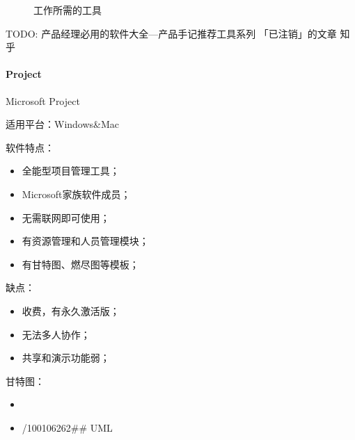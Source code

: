 \documentclass[letterpaper,10pt,english]{sphinxmanual}
\begin{document}

\begin{figure}[H]
\centering
\capstart

\noindent{}
\caption{工作所需的工具}\label{\detokenize{chapter_knowledge/tools:id4}}\end{figure}

TODO: 产品经理必用的软件大全—产品手记推荐工具系列 \sphinxhyphen{} 「已注销」的文章 \sphinxhyphen{}
知乎 


\paragraph{Project}
\label{\detokenize{chapter_knowledge/tools:project}}
Microsoft Project

适用平台：Windows\&Mac

软件特点：
\begin{itemize}
\item {} 
全能型项目管理工具；

\item {} 
Microsoft家族软件成员；

\item {} 
无需联网即可使用；

\item {} 
有资源管理和人员管理模块；

\item {} 
有甘特图、燃尽图等模板；

\end{itemize}

缺点：
\begin{itemize}
\item {} 
收费，有永久激活版；

\item {} 
无法多人协作；

\item {} 
共享和演示功能弱；

\end{itemize}

甘特图：
\begin{itemize}
\item {} 

\item {} 
/100106262\#\# UML

\end{itemize}
\end{document}
